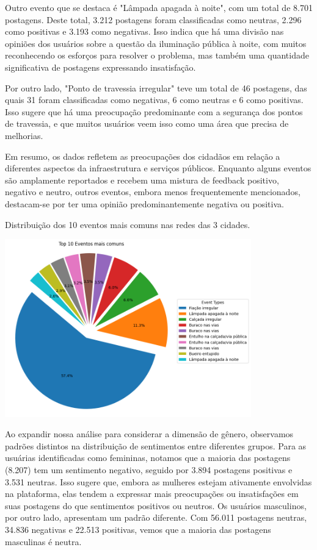 Outro evento que se destaca é "Lâmpada apagada à noite", com um total de 8.701 postagens. Deste total, 3.212 postagens foram classificadas como neutras, 2.296 como positivas e 3.193 como negativas. Isso indica que há uma divisão nas opiniões dos usuários sobre a questão da iluminação pública à noite, com muitos reconhecendo os esforços para resolver o problema, mas também uma quantidade significativa de postagens expressando insatisfação.

Por outro lado, "Ponto de travessia irregular" teve um total de 46 postagens, das quais 31 foram classificadas como negativas, 6 como neutras e 6 como positivas. Isso sugere que há uma preocupação predominante com a segurança dos pontos de travessia, e que muitos usuários veem isso como uma área que precisa de melhorias.

Em resumo, os dados refletem as preocupações dos cidadãos em relação a diferentes aspectos da infraestrutura e serviços públicos. Enquanto alguns eventos são amplamente reportados e recebem uma mistura de feedback positivo, negativo e neutro, outros eventos, embora menos frequentemente mencionados, destacam-se por ter uma opinião predominantemente negativa ou positiva.

\begin{quadro}[!htb]
	\caption{Distribuição dos 10 eventos mais comuns nas redes das 3 cidades.}
	\label{fig:pie_most_common_events}
	\centering
	\includegraphics[width=0.8\textwidth]{images/pie_most_common_events.png}
	\fautor
\end{quadro}

Ao expandir nossa análise para considerar a dimensão de gênero, observamos padrões distintos na distribuição de sentimentos entre diferentes grupos. Para as usuárias identificadas como femininas, notamos que a maioria das postagens (8.207) tem um sentimento negativo, seguido por 3.894 postagens positivas e 3.531 neutras. Isso sugere que, embora as mulheres estejam ativamente envolvidas na plataforma, elas tendem a expressar mais preocupações ou insatisfações em suas postagens do que sentimentos positivos ou neutros. Os usuários masculinos, por outro lado, apresentam um padrão diferente. Com 56.011 postagens neutras, 34.836 negativas e 22.513 positivas, vemos que a maioria das postagens masculinas é neutra.

